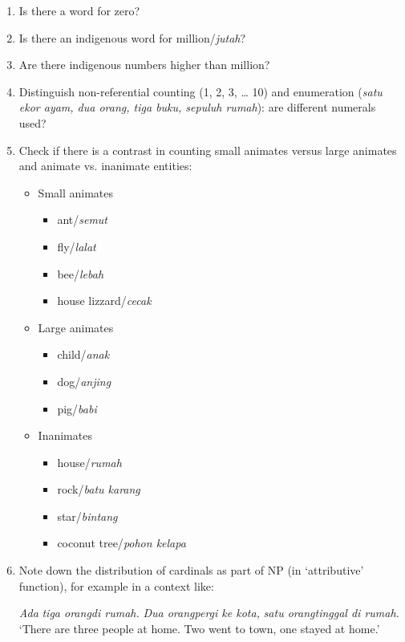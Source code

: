 \begin{enumerate}
\item Is there a word for zero?
\item Is there an indigenous word for million/\textit{jutah}? 
\item Are there indigenous numbers higher than million?
\item Distinguish non-referential counting (1, 2, 3, {\dots} 10) and enumeration (\textit{satu ekor ayam, dua orang, tiga buku, sepuluh rumah}): are different numerals used?
\item Check if there is a contrast in counting small animates versus large animates and animate vs. inanimate entities: 
  \begin{itemize}
  \item Small animates 
    \begin{itemize}
    \item ant/\textit{semut}  
    \item fly/\textit{lalat} 
    \item bee/\textit{lebah} 
    \item house lizzard/\textit{cecak}   
    \end{itemize}
  \item Large animates  
    \begin{itemize}
    \item child/\textit{anak}  
    \item dog/\textit{anjing} 
    \item pig/\textit{babi}  
    \end{itemize}
  \item Inanimates 
    \begin{itemize}
    \item house/\textit{rumah}  
    \item rock/\textit{batu karang}  
    \item star/\textit{bintang}  
    \item coconut tree/\textit{pohon kelapa} 
    \end{itemize} 
  \end{itemize}
\item Note down the distribution of cardinals as part of NP (in `attributive' function), for example in a context like:

\textit{Ada} \textit{tiga orang}\textit{di rumah.} \textit{Dua orang}\textit{pergi ke kota,} \textit{satu orang}\textit{tinggal di rumah.} `There are three people at home. Two went to town, one stayed at home.' 



\end{enumerate}
